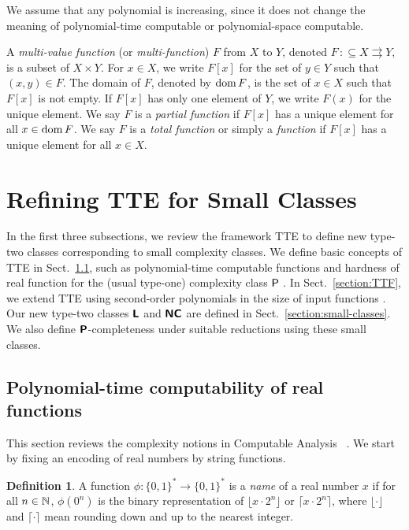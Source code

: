 \documentclass{article}
\theoremstyle{definition}
\newtheorem{definition}[theorem]{Definition}
\theoremstyle{remark}
\newcommand{\pcolon}{\mathpunct{\,:\subseteq}}
\begin{document}
We assume that any polynomial is increasing,
since it does not change the meaning of 
polynomial-time computable or polynomial-space computable.

A {\em multi-value function} (or {\em multi-function}) $F$ from $X$ to $Y$,
denoted $F \pcolon X \rightrightarrows Y$,
is a subset of $X \times Y$.
For $x \in X$, we write $F[x]$ for the set of $y \in Y$ such that $(x,y) \in F$.
The domain of $F$, denoted by $\mathop{\rm dom} F$, is the set of $x \in X$ such that 
$F[x]$ is not empty.
If $F[x]$ has only one element of $Y$, we write $F(x)$ for the unique element.
We say $F$ is a {\em partial function} if $F[x]$ has a unique element for all
$x \in \mathop{\rm dom} F$.
We say $F$ is a {\em total function} or simply a {\em function} 
if $F[x]$ has a unique element for all $x \in X$.

\section{Refining TTE for Small Classes}
\label{section: computable analysis}
In the first three subsections,
we review the framework TTE
to define new type-two classes corresponding to small complexity classes.
We define basic concepts of TTE in Sect.~\ref{section:TTE},
such as polynomial-time computable functions and hardness of real function
for the (usual type-one) complexity class $\mathsf{P}$ \cite{ko1991complexity}.
In Sect.~\ref{section:TTF}, we extend TTE using second-order polynomials
in the size of input functions \cite{kawamura2012complexity}.
Our new type-two classes $\text{\bfseries \sffamily \upshape L}$ and $\text{\bfseries \sffamily \upshape NC}$ are defined in Sect.~\ref{section:small-classes}.
We also define $\text{\bfseries \sffamily \upshape P}$-completeness under suitable reductions using these small classes.

\subsection{Polynomial-time computability of real functions}
\label{section:TTE}

This section reviews the complexity notions 
in Computable Analysis~%
\cite{ko1991complexity,weihrauch00:_comput_analy}. 
We start by fixing an encoding of real numbers 
by string functions.

\begin{definition}
 A function $\phi \colon \{0, 1\} ^* \to \{0, 1\} ^*$ is a \emph{name} of a real number $x$ 
 if for all $n \in \mathbb N$,
  $\phi(0^n)$ is the binary representation of $\lfloor x \cdot 2^n \rfloor$ or
  $\lceil x \cdot 2^n \rceil$,
 where $\lfloor \cdot \rfloor$ and $\lceil \cdot \rceil$ mean
 rounding down and up to the nearest integer.
\end{definition}
\end{document}
